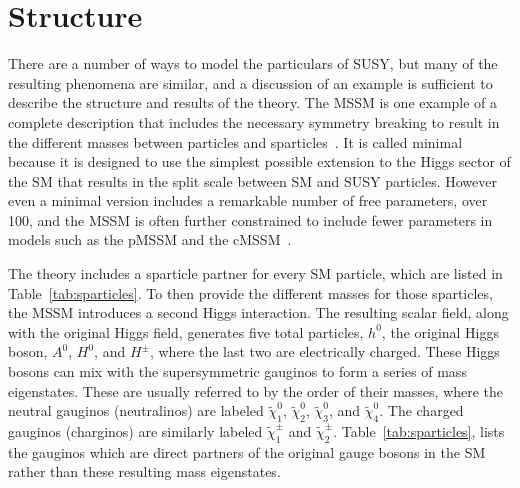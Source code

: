 
\section{Structure}
\label{sec:mssm}

There are a number of ways to model the particulars of \ac{SUSY}, but many of the resulting phenomena are similar, and a discussion of an example is sufficient to describe the structure and results of the theory.
The \ac{MSSM} is one example of a complete description that includes the necessary symmetry breaking to result in the different masses between particles and sparticles~\cite{mssm}.
It is called minimal because it is designed to use the simplest possible extension to the Higgs sector of the \ac{SM} that results in the split scale between \ac{SM} and \ac{SUSY} particles.
However even a minimal version includes a remarkable number of free parameters, over 100, and the \ac{MSSM} is often further constrained to include fewer parameters in models such as the \ac{pMSSM} and the \ac{cMSSM}~\cite{pmssm}.

The theory includes a sparticle partner for every \ac{SM} particle, which are listed in Table~\ref{tab:sparticles}.
To then provide the different masses for those sparticles, the \ac{MSSM} introduces a second Higgs interaction.
The resulting scalar field, along with the original Higgs field, generates five total particles, $h^0$, the original Higgs boson, $A^0$, $H^0$, and $H^\pm$, where the last two are electrically charged.
These Higgs bosons can mix with the supersymmetric gauginos to form a series of mass eigenstates.
These are usually referred to by the order of their masses, where the neutral gauginos (neutralinos) are labeled $\tilde{\chi}_1^0$, $\tilde{\chi}_2^0$, $\tilde{\chi}_3^0$, and $\tilde{\chi}_4^0$. 
The charged gauginos (charginos) are similarly labeled $\tilde{\chi}_1^\pm$ and $\tilde{\chi}_2^\pm$. 
Table~\ref{tab:sparticles}, lists the gauginos which are direct partners of the original gauge bosons in the \ac{SM} rather than these resulting mass eigenstates.

